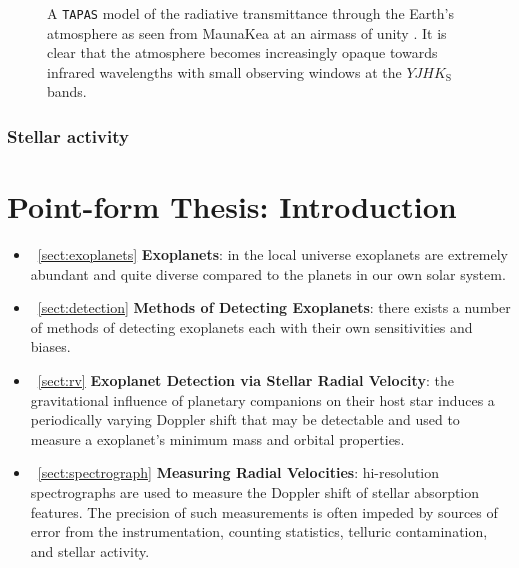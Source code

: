 \begin{figure}
  \centering
  \caption{A \texttt{TAPAS} model of the radiative transmittance through the Earth's atmosphere
    as seen from MaunaKea at an airmass of unity \citep{bertaux14}. It is clear that the atmosphere
    becomes increasingly opaque towards infrared wavelengths with small observing windows at the
    $YJHK_{\text{S}}$ bands.}
  \label{fig:transmission}
\end{figure}

\subsubsection{Stellar activity}




\section{Point-form Thesis: Introduction}
\begin{itemize}
\renewcommand\labelitemi{--}
\item~\ref{sect:exoplanets} \textbf{Exoplanets}: in the local universe exoplanets are 
extremely abundant and quite diverse compared to the planets in our own solar system.
\item~\ref{sect:detection} \textbf{Methods of Detecting Exoplanets}: there exists a 
number of methods of detecting exoplanets each with their own sensitivities and biases.
\item~\ref{sect:rv} \textbf{Exoplanet Detection via Stellar Radial Velocity}: the 
  gravitational influence of planetary companions on their host star induces a periodically
  varying Doppler shift that may be detectable and used to measure a exoplanet's minimum mass
  and orbital properties.
\item~\ref{sect:spectrograph} \textbf{Measuring Radial Velocities}: hi-resolution 
  spectrographs are used to measure the Doppler shift of stellar absorption features.
  The precision of such measurements is often impeded by sources of error from the
  instrumentation, counting statistics, telluric contamination, and stellar activity.
\end{itemize}
